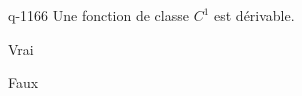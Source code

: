 \begin{truefalse}{q-1166}
Une fonction de classe $C^1$ est dérivable.
\item* Vrai
\item Faux
\end{truefalse}

